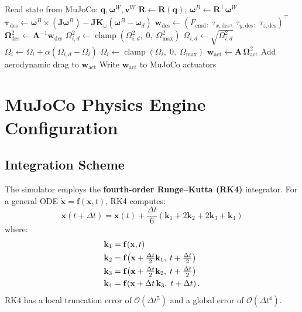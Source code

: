 \documentclass[journal]{IEEEtran}
\newcommand{\R}{\mathbf{R}}
\newcommand{\J}{\mathbf{J}}
\newcommand{\w}{\mathbf{w}}
\newcommand{\A}{\mathbf{A}}
\newcommand{\bomega}{\boldsymbol{\omega}}
\newcommand{\btau}{\boldsymbol{\tau}}
\newcommand{\bOmega}{\boldsymbol{\Omega}}
\newcommand{\clamp}{\operatorname{clamp}}
\begin{document}
\begin{algorithm}[!t]
  \caption{Motor-Level Model — Single Control Cycle}
  \label{alg:motor_model}
  \begin{algorithmic}[1]
    \STATE Read state from MuJoCo: $\mathbf{q}, \bomega^W, \mathbf{v}^W$
    \STATE $\R \leftarrow \R(\mathbf{q})$; \quad $\bomega^B \leftarrow \R^\top \bomega^W$
    \STATE $\btau_{\text{des}} \leftarrow \bomega^B \!\times\! (\J\bomega^B) - \J\mathbf{K}_\omega(\bomega^B - \bomega_d)$
    \STATE $\w_{\text{des}} \leftarrow (F_{\text{cmd}},\; \tau_{x,\text{des}},\; \tau_{y,\text{des}},\; \tau_{z,\text{des}})^\top$
    \STATE $\bOmega_{\text{des}}^2 \leftarrow \A^{-1} \w_{\text{des}}$ \hfill{}
      \STATE $\Omega_{i,d}^2 \leftarrow \clamp(\Omega_{i,d}^2, \; 0, \; \Omega_{\max}^2)$
      \STATE $\Omega_{i,d} \leftarrow \sqrt{\Omega_{i,d}^2}$
      \STATE $\Omega_i \leftarrow \Omega_i + \alpha(\Omega_{i,d} - \Omega_i)$ \hfill{}
      \STATE $\Omega_i \leftarrow \clamp(\Omega_i, \; 0, \; \Omega_{\max})$
    \ENDFOR
    \STATE $\w_{\text{act}} \leftarrow \A \, \bOmega_{\text{act}}^2$ \hfill{}
    \STATE Add aerodynamic drag to $\w_{\text{act}}$
    \STATE Write $\w_{\text{act}}$ to MuJoCo actuators
  \end{algorithmic}
\end{algorithm}


\section{MuJoCo Physics Engine Configuration}
\label{sec:mujoco}

\subsection{Integration Scheme}

The simulator employs the \textbf{fourth-order Runge--Kutta (RK4)} integrator. For a general ODE $\dot{\mathbf{x}} = \mathbf{f}(\mathbf{x}, t)$, RK4 computes:
\begin{equation}
  \mathbf{x}(t + \Delta t) = \mathbf{x}(t) + \frac{\Delta t}{6}(\mathbf{k}_1 + 2\mathbf{k}_2 + 2\mathbf{k}_3 + \mathbf{k}_4)
  \label{eq:rk4}
\end{equation}
where:
\begin{align}
  \mathbf{k}_1 &= \mathbf{f}(\mathbf{x}, t) \notag \\
  \mathbf{k}_2 &= \mathbf{f}\!\left(\mathbf{x} + \tfrac{\Delta t}{2}\mathbf{k}_1, \; t + \tfrac{\Delta t}{2}\right) \notag \\
  \mathbf{k}_3 &= \mathbf{f}\!\left(\mathbf{x} + \tfrac{\Delta t}{2}\mathbf{k}_2, \; t + \tfrac{\Delta t}{2}\right) \notag \\
  \mathbf{k}_4 &= \mathbf{f}\!\left(\mathbf{x} + \Delta t \, \mathbf{k}_3, \; t + \Delta t\right). \notag
\end{align}
RK4 has a local truncation error of $\mathcal{O}(\Delta t^5)$ and a global error of $\mathcal{O}(\Delta t^4)$.
\end{document}
